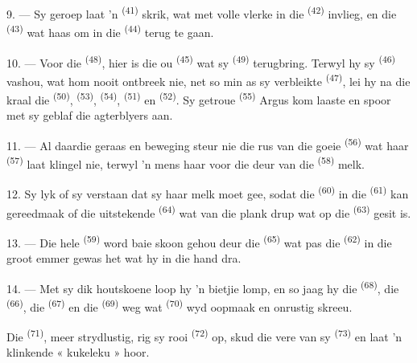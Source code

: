 9. --- Sy geroep laat 'n  \textsuperscript{(41)} skrik, wat met volle
vlerke in die  \textsuperscript{(42)} invlieg, en die 
\textsuperscript{(43)} wat haas om in die  \textsuperscript{(44)}
terug te gaan.

10. --- Voor die  \textsuperscript{(48)}, hier is die ou
 \textsuperscript{(45)} wat sy  \textsuperscript{(49)}
terugbring. Terwyl hy sy  \textsuperscript{(46)} vashou, wat hom nooit
ontbreek nie, net so min as sy verbleikte  \textsuperscript{(47)}, lei hy
na die kraal die  \textsuperscript{(50)}, 
\textsuperscript{(53)},  \textsuperscript{(54)}, 
\textsuperscript{(51)} en  \textsuperscript{(52)}. Sy getroue
 \textsuperscript{(55)} Argus kom laaste en spoor met sy geblaf die
agterblyers aan.

11. --- Al daardie geraas en beweging steur nie die rus van die goeie 
\textsuperscript{(56)} wat haar  \textsuperscript{(57)} laat klingel nie,
terwyl 'n mens haar voor die deur van die  \textsuperscript{(58)} melk.

12. Sy lyk of sy verstaan dat sy haar melk moet gee, sodat die 
\textsuperscript{(60)}  in die  \textsuperscript{(61)} kan
gereedmaak of die uitstekende  \textsuperscript{(64)} wat van die plank drup
wat op die  \textsuperscript{(63)} gesit is.

13. --- Die hele  \textsuperscript{(59)} word baie skoon gehou deur die
 \textsuperscript{(65)} wat pas die 
\textsuperscript{(62)} in die groot emmer gewas het wat hy in die hand dra.

\VUsaut{3.0mm}
\VUsaut{3.0mm}

14. --- Met sy dik houtskoene loop hy 'n bietjie lomp, en so jaag hy die
 \textsuperscript{(68)}, die  \textsuperscript{(66)}, die
 \textsuperscript{(67)} en die 
\textsuperscript{(69)} weg wat  \textsuperscript{(70)} wyd oopmaak en
onrustig skreeu.

Die  \textsuperscript{(71)}, meer strydlustig, rig sy rooi 
\textsuperscript{(72)} op, skud die vere van sy  \textsuperscript{(73)} en
laat 'n klinkende « kukeleku » hoor.

